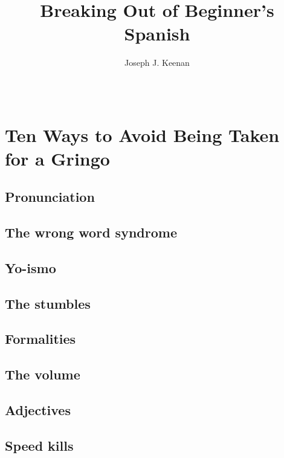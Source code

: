 
\usepackage[hidelinks]{hyperref}



\frontmatter

\begin{titlingpage}
\title{Breaking Out of Beginner's Spanish}
\author{Joseph J. Keenan}
\date{~}
\maketitle
\end{titlingpage}

\tableofcontents*

\mainmatter

\chapter{Ten Ways to Avoid Being Taken for a Gringo}

\section{Pronunciation}
\section{The wrong word syndrome}
\section{Yo-ismo}
\section{The stumbles}
\section{Formalities}
\section{The volume}
\section{Adjectives}
\section{Speed kills}
